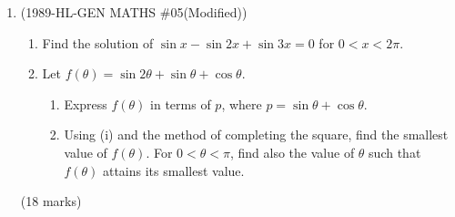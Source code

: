 \documentclass[12pt]{article}
\begin{document}
\begin{enumerate}
        \hrulefill
        
        \hrulefill
        
        \hrulefill

    \pagebreak
        \item (1989-HL-GEN MATHS \#05(Modified))  \begin{enumerate}
            \item Find the solution of $\sin{x}-\sin{2x}+\sin{3x}=0$ for $0<x<2\pi$.
            \item Let $f(\theta)=\sin{2\theta}+\sin{\theta}+\cos{\theta}$.\begin{enumerate}
                \item Express $f(\theta)$ in terms of $p$, where $p=\sin{\theta}+\cos{\theta}$.
                \item Using (i) and the method of completing the square, find the smallest value of $f(\theta)$. For $0<\theta<\pi$, find also the value of $\theta$ such that $f(\theta)$ attains its smallest value.
            \end{enumerate}
        \end{enumerate}\hfill(18 marks)

        \hrulefill
            
            \hrulefill
            
            \hrulefill
            
            \hrulefill
            
            \hrulefill
            
            \hrulefill
            
            \hrulefill
            
            \hrulefill
            
            \hrulefill
            
            \hrulefill
            
            \hrulefill
            
            \hrulefill
            
            \hrulefill
            
            \hrulefill
            
            \hrulefill
            
            \hrulefill
            
            \hrulefill
            
            \hrulefill
            

\end{enumerate}
\end{document}

